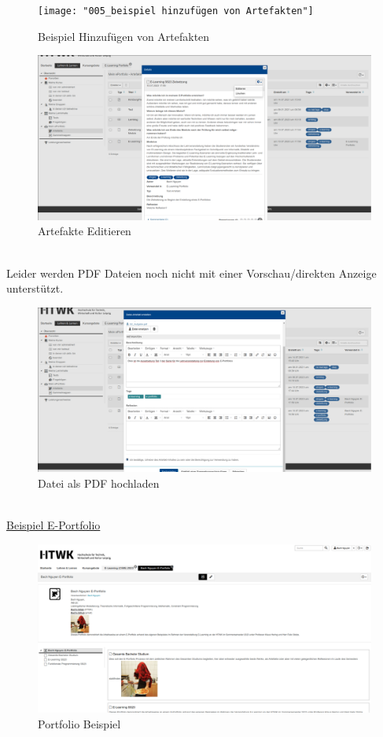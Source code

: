\documentclass[a4paper,oneside]{scrarticle}
\begin{document}
	\begin{figure}[h]
		\centering
		\texttt{[image: "005\_beispiel hinzufügen von Artefakten"]}
		\caption{Beispiel Hinzufügen von Artefakten}
		\label{fig:005beispiel-hinzufugen-von-artefakten}
	\end{figure}
	\begin{figure}[h]
		\centering
		\includegraphics[width=0.8\linewidth]{006_ArtefakteEditieren}
		\caption{Artefakte Editieren}
		\label{fig:006artefakteeditieren}
	\end{figure}\\
	Leider werden PDF Dateien noch nicht mit einer Vorschau/direkten Anzeige unterstützt.\\
	\begin{figure}[h]
		\centering
		\includegraphics[width=0.8\linewidth]{007_ArtefakteHinzufugen}
		\caption{Datei als PDF hochladen}
		\label{fig:007artefaktehinzufugen}
	\end{figure}\\
\pagebreak
	\href{https://bildungsportal.sachsen.de/opal/auth/MapInvitation/1688783325130451012?4}{Beispiel E-Portfolio}
	\begin{figure}[h]
		\centering
		\includegraphics[width=0.8\linewidth]{"009_beispiel vom endportfolio"}
		\caption{Portfolio Beispiel}
		\label{fig:009beispiel-vom-endportfolio}
	\end{figure}
\end{document}
